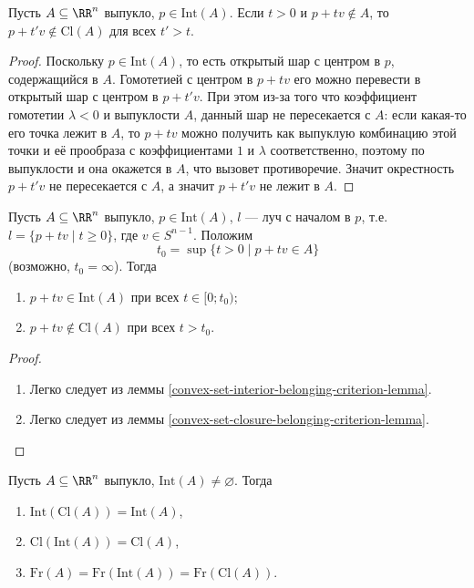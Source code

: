 \documentclass[12pt,a4paper]{article}
\newcommand{\Int}{\ensuremath{\mathrm{Int}}\xspace}
\newcommand{\Cl}{\ensuremath{\mathrm{Cl}}\xspace}
\newcommand{\Fr}{\ensuremath{\mathrm{Fr}}\xspace}
\begin{document}
    \begin{lemma}\label{convex-set-closure-belonging-criterion-lemma}
        Пусть $A \subseteq \RR^n$ выпукло, $p \in \Int(A)$. Если $t > 0$ и $p + tv \notin A$, то $p + t'v \notin \Cl(A)$ для всех $t' > t$.
    \end{lemma}

    \begin{proof}
        Поскольку $p \in \Int(A)$, то есть открытый шар с центром в $p$, содержащийся в $A$. Гомотетией с центром в $p + tv$ его можно перевести в открытый шар с центром в $p+t'v$. При этом из-за того что коэффициент гомотетии $\lambda < 0$ и выпуклости $A$, данный шар не пересекается с $A$: если какая-то его точка лежит в $A$, то $p + tv$ можно получить как выпуклую комбинацию этой точки и её прообраза с коэффициентами $1$ и $\lambda$ соответственно, поэтому по выпуклости и она окажется в $A$, что вызовет противоречие. Значит окрестность $p + t'v$ не пересекается с $A$, а значит $p + t'v$ не лежит в $A$.
    \end{proof}

    \begin{lemma}
        Пусть $A \subseteq \RR^n$ выпукло, $p \in \Int(A)$, $l$ --- луч с началом в $p$, т.е. $l = \{ p + tv \mid t \geqslant 0\}$, где $v \in S^{n-1}$. Положим
        \[t_0 = \sup \{t > 0 \mid p + tv \in A\}\]
        (возможно, $t_0 = \infty$). Тогда
        \begin{enumerate}
            \item $p + tv \in \Int(A)$ при всех $t \in [0; t_0)$;
            \item $p + tv \notin \Cl(A)$ при всех $t > t_0$.
        \end{enumerate}
    \end{lemma}

    \begin{proof}
        \begin{enumerate}
            \item Легко следует из леммы \ref{convex-set-interior-belonging-criterion-lemma}.
            \item Легко следует из леммы \ref{convex-set-closure-belonging-criterion-lemma}.
        \end{enumerate}
    \end{proof}

    \begin{theorem}
        Пусть $A \subseteq \RR^n$ выпукло, $\Int(A) \neq \varnothing$. Тогда
        \begin{enumerate}
            \item $\Int(\Cl(A)) = \Int(A)$,
            \item $\Cl(\Int(A)) = \Cl(A)$,
            \item $\Fr(A) = \Fr(\Int(A)) = \Fr(\Cl(A))$.
        \end{enumerate}
    \end{theorem}
\end{document}
